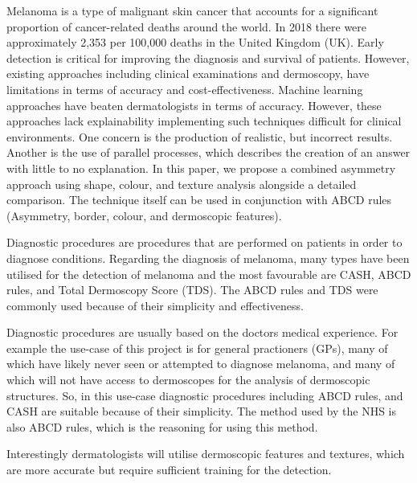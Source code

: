 Melanoma is a type of malignant skin cancer that accounts for a significant proportion of cancer-related deaths around the world. In 2018 there were approximately 2,353 per 100,000 deaths in the United Kingdom (UK)\cite{UK2019}. Early detection is critical for improving the diagnosis and survival of patients. However, existing approaches including clinical examinations and dermoscopy, have limitations in terms of accuracy and cost-effectiveness\cite{Takiddin2021}. Machine learning approaches have beaten dermatologists in terms of accuracy\cite{Andre2017}. However, these approaches lack explainability implementing such techniques difficult for clinical environments\cite{Fan2017}. One concern is the production of realistic, but incorrect results\cite{Ghorbani2019}. Another is the use of parallel processes, which describes the creation of an answer with little to no explanation. In this paper, we propose a combined asymmetry approach using shape, colour, and texture analysis alongside a detailed comparison. The technique itself can be used in conjunction with ABCD rules (Asymmetry, border, colour, and dermoscopic features).

Diagnostic procedures are procedures that are performed on patients in order to diagnose conditions. Regarding the diagnosis of melanoma, many types have been utilised for the detection of melanoma and the most favourable are CASH, ABCD rules, and Total Dermoscopy Score (TDS). The ABCD rules and TDS were commonly used because of their simplicity and effectiveness.

Diagnostic procedures are usually based on the doctors medical experience. For example the use-case of this project is for general practioners (GPs), many of which have likely never seen or attempted to diagnose melanoma, and many of which will not have access to dermoscopes for the analysis of dermoscopic structures. So, in this use-case diagnostic procedures including ABCD rules, and CASH are suitable because of their simplicity. The method used by the NHS is also ABCD rules, which is the reasoning for using this method. 

Interestingly dermatologists will utilise dermoscopic features and textures, which are more accurate but require sufficient training for the detection.


